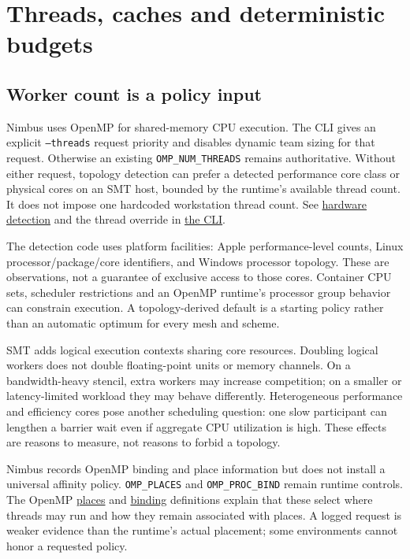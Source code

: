 \section{Threads, caches and deterministic budgets}

\subsection{Worker count is a policy input}

Nimbus uses OpenMP for shared-memory CPU execution. The CLI gives an explicit
\texttt{--threads} request priority and disables dynamic team sizing for that
request. Otherwise an existing \texttt{OMP\_NUM\_THREADS} remains authoritative.
Without either request, topology detection can prefer a detected performance
core class or physical cores on an SMT host, bounded by the runtime's available
thread count. It does not impose one hardcoded workstation thread count.
See \href{../src/core/infra/hardware_info.cpp}{hardware detection} and the
thread override in \href{../src/core/runtime/nimbus_sim.cpp}{the CLI}.

The detection code uses platform facilities: Apple performance-level counts,
Linux processor/package/core identifiers, and Windows processor topology.
These are observations, not a guarantee of exclusive access to those cores.
Container CPU sets, scheduler restrictions and an OpenMP runtime's processor
group behavior can constrain execution. A topology-derived default is a
starting policy rather than an automatic optimum for every mesh and scheme.

SMT adds logical execution contexts sharing core resources. Doubling logical
workers does not double floating-point units or memory channels. On a
bandwidth-heavy stencil, extra workers may increase competition; on a smaller
or latency-limited workload they may behave differently. Heterogeneous
performance and efficiency cores pose another scheduling question: one slow
participant can lengthen a barrier wait even if aggregate CPU utilization is
high. These effects are reasons to measure, not reasons to forbid a topology.

Nimbus records OpenMP binding and place information but does not install a
universal affinity policy. \texttt{OMP\_PLACES} and \texttt{OMP\_PROC\_BIND}
remain runtime controls. The OpenMP
\href{https://www.openmp.org/spec-html/5.1/openmpse62.html}{places} and
\href{https://www.openmp.org/spec-html/5.0/openmpse52.html}{binding}
definitions explain that these select where threads may run and how they
remain associated with places. A logged request is weaker evidence than the
runtime's actual placement; some environments cannot honor a requested policy.


